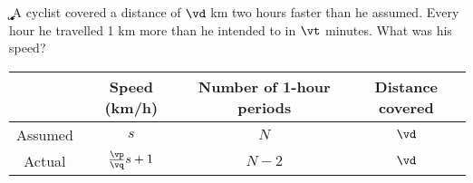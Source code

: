 

\LCM\va\vb\vc
\MULTIPLY{}\vd %
\ADD{}\ve 
\SUBTRACT{}\a
\FRACTIONSIMPLIFY\a\va\vp\vq
\FRACMULT\vp{}\vr\vs
\FRACMULT\vp\vq{}\k\m %
\SUBTRACT\k\ve\c 
\FRACMULT\a{}\vt\b %

\MULTIPLY\vd\vs\d %
\MULTIPLY\c\vs\b %

\question[5] A cyclist covered a distance of $\vd$ km two hours faster than he assumed. Every hour
he travelled 1 km more than he intended to in $\vt$ minutes. What was his speed?

\watchout


\ifprintanswers
  	\begin{tabular}{cccc}
  	    \toprule
  		& Speed (km/h) & Number of 1-hour periods & Distance covered \\
  		\midrule
  		Assumed & $s$ & $N$ & $\vd$ \\
  		Actual & $\frac\vp\vq s + 1$ & $N-2$ & $\vd$ \\
  		\bottomrule
  	\end{tabular}
\fi 

